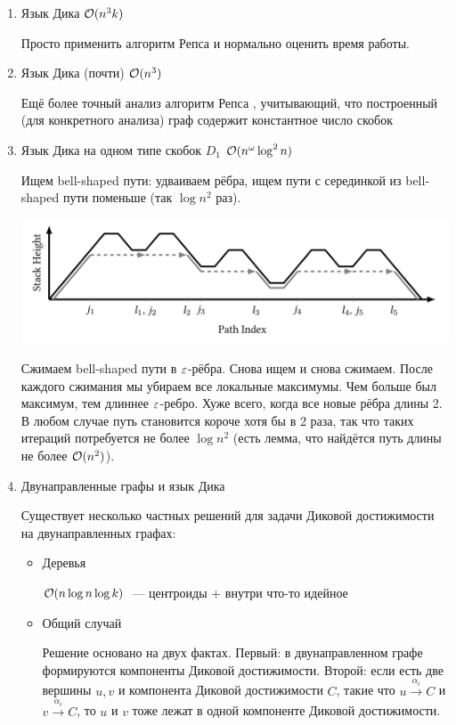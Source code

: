 \begin{enumerate}
    \item Язык Дика $\mathcal{O}(n^3 k)$ \cite{Kodumal04}

    Просто применить алгоритм Репса \cite{Reps97} и нормально оценить время работы.

    \item Язык Дика (почти) $\mathcal{O}(n^3)$ \cite{Rehof01}

    Ещё более точный анализ алгоритм Репса \cite{Reps97}, учитывающий, что построенный (для конкретного анализа) граф содержит константное число скобок

    \item Язык Дика на одном типе скобок $D_1$ $\mathcal{O}(n^{\omega} \log^2 n)$ \cite{Mathiasen21}

    Ищем bell-shaped пути: удваиваем рёбра, ищем пути с серединкой из bell-shaped пути поменьше (так $\log n^2$ раз).

    \includegraphics[width=0.75\linewidth]{img/dyck1_path.png}

    Сжимаем bell-shaped пути в $\varepsilon$-рёбра. Снова ищем и снова сжимаем. После каждого сжимания мы убираем все локальные максимумы. Чем больше был максимум, тем длиннее $\varepsilon$-ребро. Хуже всего, когда все новые рёбра длины 2. В любом случае путь становится короче хотя бы в 2 раза, так что таких итераций потребуется не более $\log n^2$ (есть лемма, что найдётся путь длины не более $\mathcal{O}(n^2)$). 

    \item Двунаправленные графы и язык Дика

    Существует несколько частных решений для задачи Диковой достижимости на двунаправленных графах:

    \begin{itemize}
        \item Деревья \cite{Yuan09}

        $\mathcal{O}(n \log n \log k)$~--- центроиды + внутри что-то идейное

        \item Общий случай \cite{Chatterjee17}

        Решение основано на двух фактах. Первый: в двунаправленном графе формируются компоненты Диковой достижимости. Второй: если есть две вершины $u, v$ и компонента Диковой достижимости $C$, такие что $u \xrightarrow{\alpha_i} C$ и $v \xrightarrow{\alpha_i} C$, то $u$ и $v$ тоже лежат в одной компоненте Диковой достижимости. 


\end{itemize}
\end{enumerate}
